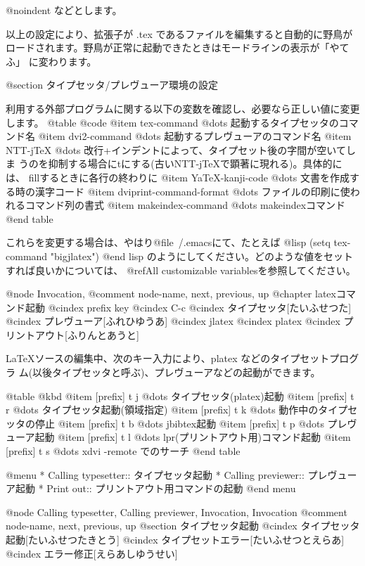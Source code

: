 @noindent 
などとします。

  以上の設定により、拡張子が .tex であるファイルを編集すると自動的に野鳥が
ロードされます。野鳥が正常に起動できたときはモードラインの表示が「やてふ」
に変わります。

@section タイプセッタ/プレヴューア環境の設定

  利用する外部プログラムに関する以下の変数を確認し、必要なら正しい値に変更
します。
@table @code
@item tex-command
        @dots{} 起動するタイプセッタのコマンド名
@item dvi2-command
        @dots{} 起動するプレヴューアのコマンド名
@item NTT-jTeX
        @dots{} 改行+インデントによって、タイプセット後の字間が空いてしま
        うのを抑制する場合にtにする(古いNTT-jTeXで顕著に現れる)。具体的には、
        fillするときに各行の終わりに%
@item YaTeX-kanji-code
        @dots{} 文書を作成する時の漢字コード
@item dviprint-command-format
        @dots{} ファイルの印刷に使われるコマンド列の書式
@item makeindex-command
        @dots{} makeindexコマンド
@end table

これらを変更する場合は、やはり@file{~/.emacs}にて、たとえば
@lisp
(setq tex-command "bigjlatex")
@end lisp
のようにしてください。どのような値をセットすれば良いかについては、
@ref{All customizable variables}を参照してください。


@node Invocation, %
@comment  node-name,  next,  previous,  up
@chapter latexコマンド起動
@cindex prefix key
@cindex C-c
@cindex タイプセッタ[たいふせつた]
@cindex プレヴューア[ふれひゆうあ]
@cindex jlatex
@cindex platex
@cindex プリントアウト[ふりんとあうと]

LaTeXソースの編集中、次のキー入力により、platex などのタイプセットプログラ
ム(以後タイプセッタと呼ぶ)、プレヴューアなどの起動ができます。

@table @kbd
@item [prefix] t j
        @dots{} タイプセッタ(platex)起動
@item [prefix] t r
        @dots{} タイプセッタ起動(領域指定)
@item [prefix] t k
        @dots{} 動作中のタイプセッタの停止
@item [prefix] t b
        @dots{} jbibtex起動
@item [prefix] t p
        @dots{} プレヴューア起動
@item [prefix] t l
        @dots{} lpr(プリントアウト用)コマンド起動
@item [prefix] t s
        @dots{} xdvi -remote でのサーチ
@end table

@menu
* Calling typesetter::          タイプセッタ起動
* Calling previewer::           プレヴューア起動
* Print out::                   プリントアウト用コマンドの起動
@end menu

@node Calling typesetter, Calling previewer, Invocation, Invocation
@comment  node-name,  next,  previous,  up
@section タイプセッタ起動
@cindex タイプセッタ起動[たいふせつたきとう]
@cindex タイプセットエラー[たいふせつとえらあ]
@cindex エラー修正[えらあしゆうせい]

